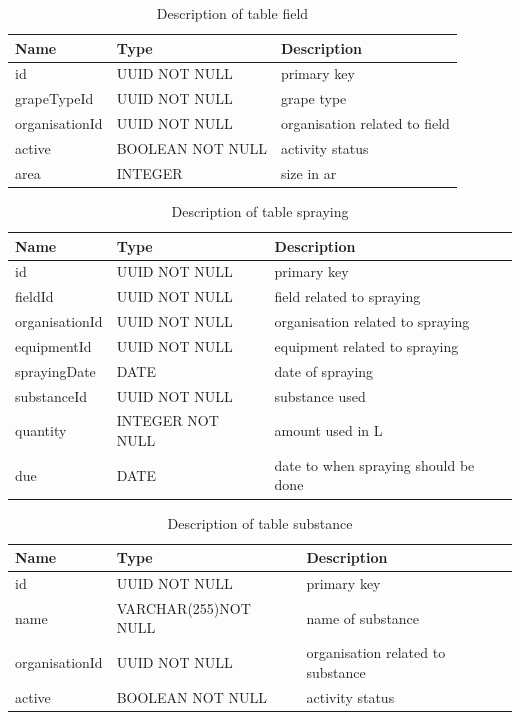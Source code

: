 \begin{table}[th]
	\centering
	\caption{Description of table field}
	\begin{tabular}{|m{}|m{}|m{}|}
		\hline
		Name & Type & Description  \\
		\hline
		id & UUID NOT NULL & primary key \\
		\hline
		grapeTypeId & UUID NOT NULL & grape type \\
		\hline
		organisationId & UUID NOT NULL & organisation related to field \\
		\hline
		active & BOOLEAN NOT NULL & activity status \\
		\hline
		area & INTEGER & size in ar\\
		\hline
	\end{tabular}
\end{table}
\begin{table}[th]
	\centering
	\caption{Description of table spraying}
	\begin{tabular}{|m{}|m{}|m{}|}
		\hline
		Name & Type & Description  \\
		\hline
		id & UUID NOT NULL & primary key \\
		\hline
		fieldId & UUID NOT NULL & field related to spraying \\
		\hline
		organisationId & UUID NOT NULL & organisation related to spraying \\
		\hline
		equipmentId & UUID NOT NULL & equipment related to spraying \\
		\hline
		sprayingDate & DATE & date of spraying \\
		\hline
		substanceId & UUID NOT NULL & substance used \\
		\hline
		quantity & INTEGER NOT NULL & amount used in L \\
		\hline
		due & DATE & date to when spraying should be done \\
		\hline
	\end{tabular}
\end{table}
\begin{table}[th]
	\centering
	\caption{Description of table substance}
	\begin{tabular}{|m{}|m{}|m{}|}
		\hline
		Name & Type & Description  \\
		\hline
		id & UUID NOT NULL & primary key \\
		\hline
		name & VARCHAR(255)\newline NOT NULL & name of substance \\
		\hline
		organisationId & UUID NOT NULL & organisation related to substance\\
		\hline
		active & BOOLEAN NOT NULL & activity status\\
		\hline
	\end{tabular}
\end{table}
